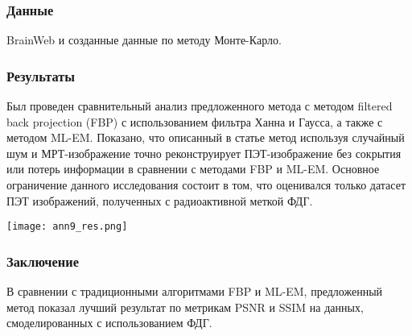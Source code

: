 \subsubsection*{Данные} BrainWeb и созданные данные по методу Монте-Карло.
\subsubsection*{Результаты}
Был проведен сравнительный анализ предложенного метода
с методом filtered back projection (FBP) с использованием фильтра 
Ханна и Гаусса, а также с методом ML-EM. Показано, что описанный в статье метод
используя случайный шум и МРТ-изображение точно реконструирует ПЭТ-изображение 
без сокрытия или потерь информации в сравнении с методами FBP и ML-EM.
Основное ограничение данного исследования состоит в том, что оценивался 
только датасет ПЭТ изображений, полученных с радиоактивной меткой ФДГ.

\begin{minipage}{1.0\linewidth}
    \begin{center}
        \texttt{[image: ann9\_res.png]} \\
    \end{center}
    
\end{minipage}
\subsubsection*{Заключение}
В сравнении с традиционными алгоритмами FBP и ML-EM, предложенный
метод показал лучший результат по метрикам PSNR и SSIM на данных, смоделированных с
использованием ФДГ.